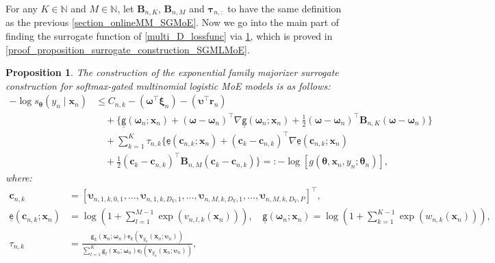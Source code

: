 \documentclass{article}
\newcommand{\mdm}{softmax-gated multinomial logistic MoE }
\newcommand{\nn}{\nonumber} %
\newtheorem{proposition}{Proposition}
\def\sfg{\mathsf{g}}
\def\ex{\mathsf{e}}
\def\vxi{{\bm{\xi}}}
\def\vtau{{\bm{\tau}}}
\def\vomega{{\bm{\omega}}}
\def\vupsilon{{\bm{\upsilon}}}
\def\vtheta{{\bm{\theta}}}
\def\vc{{\bm{c}}}
\def\vr{{\bm{r}}}
\def\vv{{\bm{v}}}
\def\vx{{\bm{x}}}
\def\evv{{v}}
\def\evw{{w}}
\def\mB{{\bm{B}}}
\def\sN{{\mathbb{N}}}
\begin{document}
For any $K \in \sN$ and $M \in \sN$, let $\mB_{n,K}$, $\mB_{n,M}$ and $\vtau_{n,:}$ to have the same definition as the previous \cref{section_onlineMM_SGMoE}.
Now we go into the main part of finding the surrogate function of \cref{multi_D_lossfunc} via \cref{proposition_surrogate_construction_SGMLMoE}, which is proved in \cref{proof_proposition_surrogate_construction_SGMLMoE}.
\begin{proposition}\label{proposition_surrogate_construction_SGMLMoE}
The construction of the exponential family majorizer surrogate construction for \mdm models is as follows:
\begin{align}
    -\log s_{\vtheta}(y_n\mid \vx_n)
    &\le C_{n,k}-\left(\vomega^{\top}\vxi_n\right)-\left(\vupsilon^{\top}\vr_n \right)\nn\\
    &\quad+\Bigg\{\underline{\sfg}(\vomega_n;\vx_n)+ (\vomega-\vomega_n)^{\top}\nabla \underline{\sfg}(\vomega_n;\vx_n)+\frac{1}{2}(\vomega-\vomega_n)^{\top}\mB_{n,K}(\vomega-\vomega_n)\Bigg\} 
   \nn\\
   &\quad +\displaystyle\sum_{k=1}^{K}\tau_{n,k}\Bigg\{\underline{\ex}(\vc_{n,k};\vx_n)+ (\vc_{k}-\vc_{n,k})^{\top}\nabla \underline{\ex}(\vc_{n,k};\vx_n)\nonumber\\
   &\quad +\frac{1}{2}(\vc_{k}-\vc_{n,k})^{\top}\mB_{n,M}(\vc_{k}-\vc_{n,k})\Bigg\}=:-\log[g(\vtheta, \vx_{n}, y_{n}; \vtheta_{n})],\label{eq_surrogate_Taylor_SGMLMoE}
\end{align}
where:
\begin{align*}
    \vc_{n,k}&=[\vupsilon_{n,1,k,0,1},\dots,\vupsilon_{n,1,k,D_V,1},\dots,\vupsilon_{n,M,k,D_V,1},\dots,\vupsilon_{n,M,k,D_V,P}]^{\top},\\
     \underline{\ex}(\vc_{n,k};\vx_n)&=\log\left(1+\sum_{l=1}^{M-1} \exp\left(\evv_{n,l,k}(\vx_n)\right)\right), \quad \underline{\sfg}(\vomega_n;\vx_n)=\log\left(1+\sum_{k=1}^{K-1} \exp\left(\evw_{n,k}(\vx_n)\right)\right),\\
    \tau_{n,k}&=\frac{\sfg_k\left(\vx_n; \vomega_n \right) \ex_k(\vv_{y_n}(\vx_n;\vupsilon_n))}{\sum_{l=1}^{K}\sfg_l\left(\vx_n; \vomega_n \right) \ex_l(\vv_{y_n}(\vx_n;\vupsilon_n))},
\end{align*}
\end{proposition}
\end{document}
